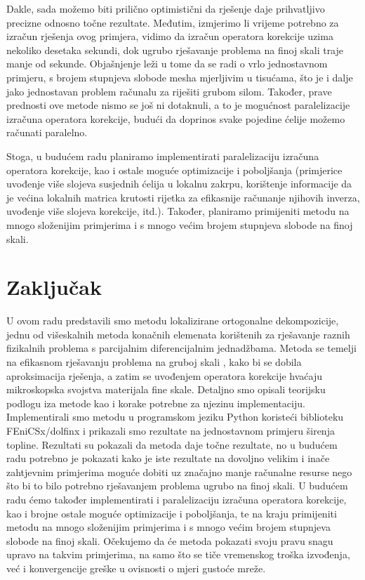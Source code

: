 \documentclass[zavrsnirad]{fer}
\begin{document}
Dakle, sada možemo biti prilično optimistični da rješenje daje prihvatljivo precizne odnosno točne rezultate.
Međutim, izmjerimo li vrijeme potrebno za izračun rješenja ovog primjera, vidimo da izračun operatora korekcije
uzima nekoliko desetaka sekundi, dok ugrubo rješavanje problema na finoj skali traje manje od sekunde.
Objašnjenje leži u tome da se radi o vrlo jednostavnom primjeru, s brojem stupnjeva slobode mesha mjerljivim u tisućama,
što je i dalje jako jednostavan problem računalu za riješiti grubom silom. Također, prave prednosti ove metode nismo se još
ni dotaknuli, a to je mogućnost paralelizacije izračuna operatora korekcije, budući da doprinos
svake pojedine ćelije možemo računati paralelno.

Stoga, u budućem radu planiramo implementirati paralelizaciju izračuna operatora korekcije,
kao i ostale moguće optimizacije i poboljšanja (primjerice uvođenje više slojeva susjednih ćelija u lokalnu zakrpu,
korištenje informacije da je većina lokalnih matrica krutosti rijetka za efikasnije računanje njihovih inverza,
uvođenje više slojeva korekcije, itd.). Također, planiramo primijeniti metodu na mnogo složenijim primjerima i
s mnogo većim brojem stupnjeva slobode na finoj skali.



\chapter{Zaključak}
\label{pog:zakljucak}

U ovom radu predstavili smo metodu lokalizirane ortogonalne dekompozicije, jednu od višeskalnih metoda konačnih elemenata
korištenih za rješavanje raznih fizikalnih problema s parcijalnim diferencijalnim jednadžbama. Metoda se temelji na efikasnom rješavanju problema na gruboj skali
, kako bi se dobila aproksimacija rješenja, a zatim se uvođenjem operatora korekcije hvaćaju mikroskopska svojstva materijala fine skale.
Detaljno smo opisali teorijsku podlogu iza metode kao i korake potrebne za njezinu implementaciju.
Implementirali smo metodu u programskom jeziku Python koristeći biblioteku FEniCSx/dolfinx
i prikazali smo rezultate na jednostavnom primjeru širenja topline. Rezultati su pokazali da metoda daje točne rezultate,
no u budućem radu potrebno je pokazati kako je iste rezultate na dovoljno velikim i inače zahtjevnim primjerima
moguće dobiti uz značajno manje računalne resurse nego što bi to bilo potrebno rješavanjem problema ugrubo na finoj skali.
U budućem radu ćemo također implementirati i paralelizaciju izračuna operatora korekcije, kao i brojne ostale moguće optimizacije i poboljšanja,
te na kraju primijeniti metodu na mnogo složenijim primjerima i s mnogo većim brojem stupnjeva slobode na finoj skali.
Očekujemo da će metoda pokazati svoju pravu snagu upravo na takvim primjerima, na samo što se tiče vremenskog troška izvođenja,
već i konvergencije greške u ovisnosti o mjeri gustoće mreže.
\end{document}
